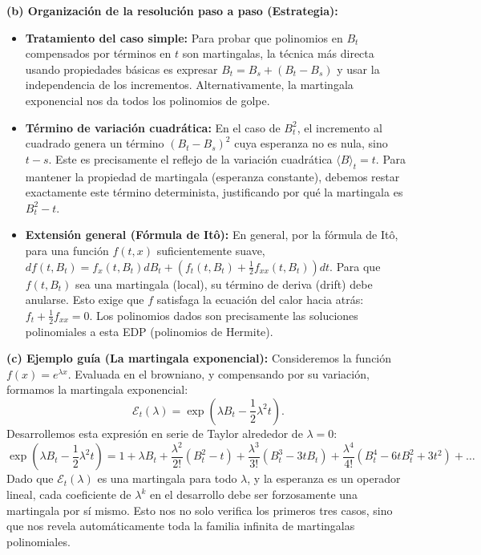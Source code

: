 \documentclass[11pt, letterpaper]{article}
\begin{document}
\begin{solucion}
    \textbf{(b) Organización de la resolución paso a paso (Estrategia):}
    \begin{itemize}
        \item[(i)] \textbf{Tratamiento del caso simple:} Para probar que polinomios en $B_t$ compensados por términos en $t$ son martingalas, la técnica más directa usando propiedades básicas es expresar $B_t = B_s + (B_t - B_s)$ y usar la independencia de los incrementos. Alternativamente, la martingala exponencial nos da todos los polinomios de golpe.
        \item[(ii)] \textbf{Término de variación cuadrática:} En el caso de $B_t^2$, el incremento al cuadrado genera un término $(B_t - B_s)^2$ cuya esperanza no es nula, sino $t-s$. Este es precisamente el reflejo de la variación cuadrática $\langle B \rangle_t = t$. Para mantener la propiedad de martingala (esperanza constante), debemos restar exactamente este término determinista, justificando por qué la martingala es $B_t^2 - t$.
        \item[(iii)] \textbf{Extensión general (Fórmula de Itô):} En general, por la fórmula de Itô, para una función $f(t,x)$ suficientemente suave, $df(t, B_t) = f_x(t, B_t)dB_t + \left(f_t(t, B_t) + \frac{1}{2}f_{xx}(t, B_t)\right)dt$. Para que $f(t, B_t)$ sea una martingala (local), su término de deriva (drift) debe anularse. Esto exige que $f$ satisfaga la ecuación del calor hacia atrás: $f_t + \frac{1}{2}f_{xx} = 0$. Los polinomios dados son precisamente las soluciones polinomiales a esta EDP (polinomios de Hermite).
    \end{itemize}

    \vspace{3mm}
    \textbf{(c) Ejemplo guía (La martingala exponencial):}
    Consideremos la función $f(x) = e^{\lambda x}$. Evaluada en el browniano, y compensando por su variación, formamos la martingala exponencial:
    $$ \mathcal{E}_t(\lambda) = \exp\left( \lambda B_t - \frac{1}{2}\lambda^2 t \right). $$
    Desarrollemos esta expresión en serie de Taylor alrededor de $\lambda = 0$:
    $$ \exp\left( \lambda B_t - \frac{1}{2}\lambda^2 t \right) = 1 + \lambda B_t + \frac{\lambda^2}{2!}(B_t^2 - t) + \frac{\lambda^3}{3!}(B_t^3 - 3tB_t) + \frac{\lambda^4}{4!}(B_t^4 - 6tB_t^2 + 3t^2) + \dots $$
    Dado que $\mathcal{E}_t(\lambda)$ es una martingala para todo $\lambda$, y la esperanza es un operador lineal, cada coeficiente de $\lambda^k$ en el desarrollo debe ser forzosamente una martingala por sí mismo. Esto nos no solo verifica los primeros tres casos, sino que nos revela automáticamente toda la familia infinita de martingalas polinomiales.


\end{solucion}
\end{document}
